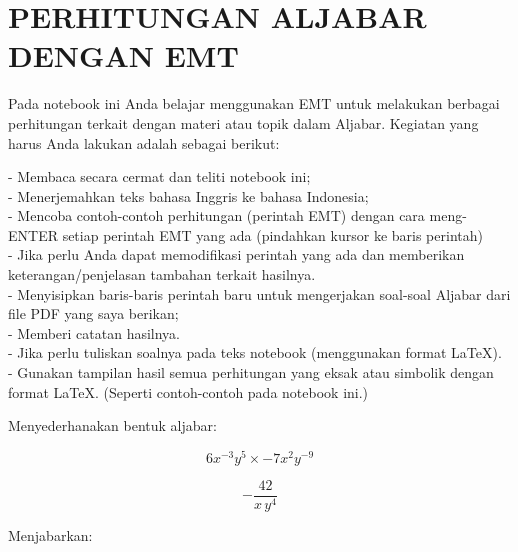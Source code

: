 \documentclass[12pt,arial,letterpaper]{book}
\begin{document}
\chapter{PERHITUNGAN ALJABAR DENGAN EMT}
\begin{eulercomment}
Pada notebook ini Anda belajar menggunakan EMT untuk melakukan
berbagai perhitungan terkait dengan materi atau topik dalam Aljabar.
Kegiatan yang harus Anda lakukan adalah sebagai berikut:

- Membaca secara cermat dan teliti notebook ini;\\
- Menerjemahkan teks bahasa Inggris ke bahasa Indonesia;\\
- Mencoba contoh-contoh perhitungan (perintah EMT) dengan cara
meng-ENTER setiap perintah EMT yang ada (pindahkan kursor ke baris
perintah)\\
- Jika perlu Anda dapat memodifikasi perintah yang ada dan memberikan
keterangan/penjelasan tambahan terkait hasilnya.\\
- Menyisipkan baris-baris perintah baru untuk mengerjakan soal-soal
Aljabar dari file PDF yang saya berikan;\\
- Memberi catatan hasilnya.\\
- Jika perlu tuliskan soalnya pada teks notebook (menggunakan format
LaTeX).\\
- Gunakan tampilan hasil semua perhitungan yang eksak atau simbolik
dengan format LaTeX. (Seperti contoh-contoh pada notebook ini.)

\end{eulercomment}
\begin{eulercomment}
Menyederhanakan bentuk aljabar:

\end{eulercomment}
\begin{eulerformula}
\[
6x^{-3}y^5\times -7x^2y^{-9}
\]
\end{eulerformula}
\begin{eulercomment}
\end{eulercomment}
\begin{eulerformula}
\[
-\frac{42}{x\,y^4}
\]
\end{eulerformula}
\begin{eulercomment}
Menjabarkan:

\end{eulercomment}
\end{document}
